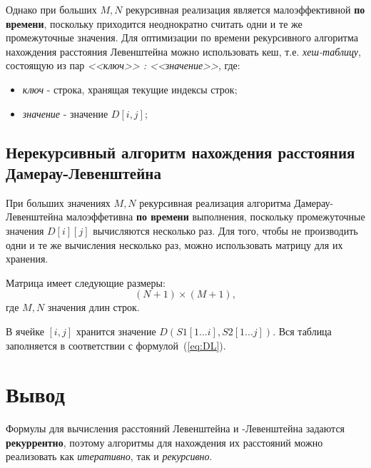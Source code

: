 Однако при больших $M, N$ рекурсивная реализация является малоэффективной \textbf{по времени}, поскольку приходится неоднократно считать одни и те же промежуточные значения. Для оптимизации по времени рекурсивного алгоритма нахождения расстояния Левенштейна можно использовать кеш, т.е. \textit{хеш-таблицу}, состоящую из пар \textit{<<ключ>> : <<значение>>}, где:
\begin{itemize}
    \item \textit{ключ} - строка, хранящая текущие индексы строк;
    \item \textit{значение} - значение $D[i, j]$;
\end{itemize}

\subsection{Нерекурсивный алгоритм нахождения расстояния Дамерау-Левенштейна}

При больших значениях $M, N$ рекурсивная реализация алгоритма Дамерау-Левенштейна малоэффетивна \textbf{по времени} выполнения, поскольку промежуточные значения $D[i][j]$ вычисляются несколько раз. Для того, чтобы не производить одни и те же вычисления несколько раз, можно использовать матрицу для их хранения.

Матрица имеет следующие размеры:
\begin{equation}
	\label{eq:lev-m-size}
	(N + 1) \times (M + 1),
\end{equation}
где $M, N$ значения длин строк.

В ячейке $[i, j]$ хранится значение $D(S1[1...i], S2[1...j])$. Вся таблица заполняется в соответствии с формулой~(\ref{eq:DL}). 

\section*{Вывод}
Формулы для вычисления расстояний Левенштейна и -Левенштейна задаются \textbf{рекуррентно}, поэтому алгоритмы для нахождения их расстояний можно реализовать как \textit{итеративно}, так и \textit{рекурсивно}.
